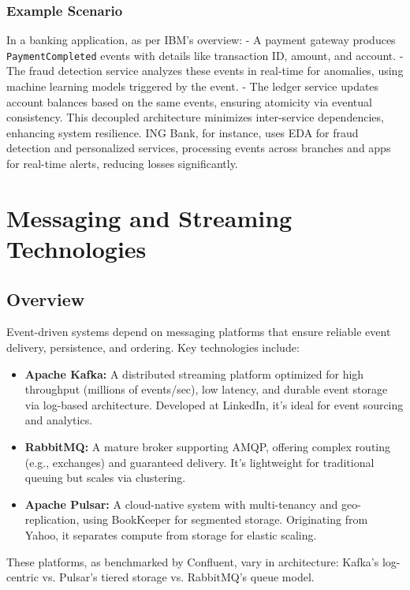 \documentclass[12pt,a4paper]{report}
\begin{document}
\subsection{Example Scenario}
In a banking application, as per IBM's overview:  
- A payment gateway produces \texttt{PaymentCompleted} events with details like transaction ID, amount, and account.  
- The fraud detection service analyzes these events in real-time for anomalies, using machine learning models triggered by the event.  
- The ledger service updates account balances based on the same events, ensuring atomicity via eventual consistency.  
This decoupled architecture minimizes inter-service dependencies, enhancing system resilience. ING Bank, for instance, uses EDA for fraud detection and personalized services, processing events across branches and apps for real-time alerts, reducing losses significantly.

\chapter{Messaging and Streaming Technologies}
\section{Overview}
Event-driven systems depend on messaging platforms that ensure reliable event delivery, persistence, and ordering. Key technologies include:

\begin{itemize}
    \item \textbf{Apache Kafka:} A distributed streaming platform optimized for high throughput (millions of events/sec), low latency, and durable event storage via log-based architecture. Developed at LinkedIn, it's ideal for event sourcing and analytics.
    \item \textbf{RabbitMQ:} A mature broker supporting AMQP, offering complex routing (e.g., exchanges) and guaranteed delivery. It's lightweight for traditional queuing but scales via clustering.
    \item \textbf{Apache Pulsar:} A cloud-native system with multi-tenancy and geo-replication, using BookKeeper for segmented storage. Originating from Yahoo, it separates compute from storage for elastic scaling.
\end{itemize}

These platforms, as benchmarked by Confluent, vary in architecture: Kafka's log-centric vs. Pulsar's tiered storage vs. RabbitMQ's queue model.
\end{document}
